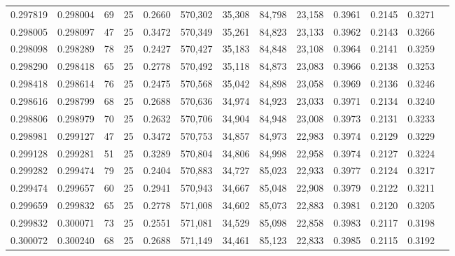\begin{tabular}{rrrrrrrrrrrrr}
0.297819 & 0.298004 &    69 &  25 &                                     0.2660 & 570,302 &  35,308 &  84,798 &  23,158 & 0.3961 & 0.2145 & 0.3271 \\
0.298005 & 0.298097 &    47 &  25 &                                     0.3472 & 570,349 &  35,261 &  84,823 &  23,133 & 0.3962 & 0.2143 & 0.3266 \\
0.298098 & 0.298289 &    78 &  25 &                                     0.2427 & 570,427 &  35,183 &  84,848 &  23,108 & 0.3964 & 0.2141 & 0.3259 \\
0.298290 & 0.298418 &    65 &  25 &                                     0.2778 & 570,492 &  35,118 &  84,873 &  23,083 & 0.3966 & 0.2138 & 0.3253 \\
0.298418 & 0.298614 &    76 &  25 &                                     0.2475 & 570,568 &  35,042 &  84,898 &  23,058 & 0.3969 & 0.2136 & 0.3246 \\
0.298616 & 0.298799 &    68 &  25 &                                     0.2688 & 570,636 &  34,974 &  84,923 &  23,033 & 0.3971 & 0.2134 & 0.3240 \\
0.298806 & 0.298979 &    70 &  25 &                                     0.2632 & 570,706 &  34,904 &  84,948 &  23,008 & 0.3973 & 0.2131 & 0.3233 \\
0.298981 & 0.299127 &    47 &  25 &                                     0.3472 & 570,753 &  34,857 &  84,973 &  22,983 & 0.3974 & 0.2129 & 0.3229 \\
0.299128 & 0.299281 &    51 &  25 &                                     0.3289 & 570,804 &  34,806 &  84,998 &  22,958 & 0.3974 & 0.2127 & 0.3224 \\
0.299282 & 0.299474 &    79 &  25 &                                     0.2404 & 570,883 &  34,727 &  85,023 &  22,933 & 0.3977 & 0.2124 & 0.3217 \\
0.299474 & 0.299657 &    60 &  25 &                                     0.2941 & 570,943 &  34,667 &  85,048 &  22,908 & 0.3979 & 0.2122 & 0.3211 \\
0.299659 & 0.299832 &    65 &  25 &                                     0.2778 & 571,008 &  34,602 &  85,073 &  22,883 & 0.3981 & 0.2120 & 0.3205 \\
0.299832 & 0.300071 &    73 &  25 &                                     0.2551 & 571,081 &  34,529 &  85,098 &  22,858 & 0.3983 & 0.2117 & 0.3198 \\
0.300072 & 0.300240 &    68 &  25 &                                     0.2688 & 571,149 &  34,461 &  85,123 &  22,833 & 0.3985 & 0.2115 & 0.3192 \\

\end{tabular}
